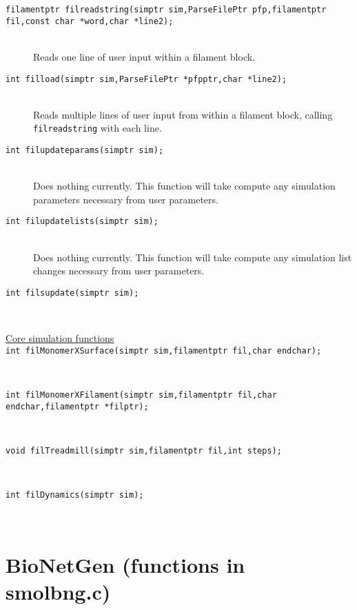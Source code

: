 \documentclass {book}
\begin{document}
\begin{description}
\item[\texttt{filamentptr filreadstring(simptr sim,ParseFilePtr pfp,filamentptr fil,const char *word,char *line2);}]
\hfill \\
Reads one line of user input within a filament block.

\item[\texttt{int filload(simptr sim,ParseFilePtr *pfpptr,char *line2);}]
\hfill \\
Reads multiple lines of user input from within a filament block, calling \texttt{filreadstring} with each line.

\item[\texttt{int filupdateparams(simptr sim);}]
\hfill \\
Does nothing currently.  This function will take compute any simulation parameters necessary from user parameters.

\item[\texttt{int filupdatelists(simptr sim);}]
\hfill \\
Does nothing currently.  This function will take compute any simulation list changes necessary from user parameters.

\item[\texttt{int filsupdate(simptr sim);}]
\hfill \\

\item[\underline{Core simulation functions}]

\item[\texttt{int filMonomerXSurface(simptr sim,filamentptr fil,char endchar);}]
\hfill \\

\item[\texttt{int filMonomerXFilament(simptr sim,filamentptr fil,char endchar,filamentptr *filptr);}]
\hfill \\

\item[\texttt{void filTreadmill(simptr sim,filamentptr fil,int steps);}]
\hfill \\

\item[\texttt{int filDynamics(simptr sim);}]
\hfill \\



\end{description}

\section{BioNetGen (functions in smolbng.c)}
\end{document}
